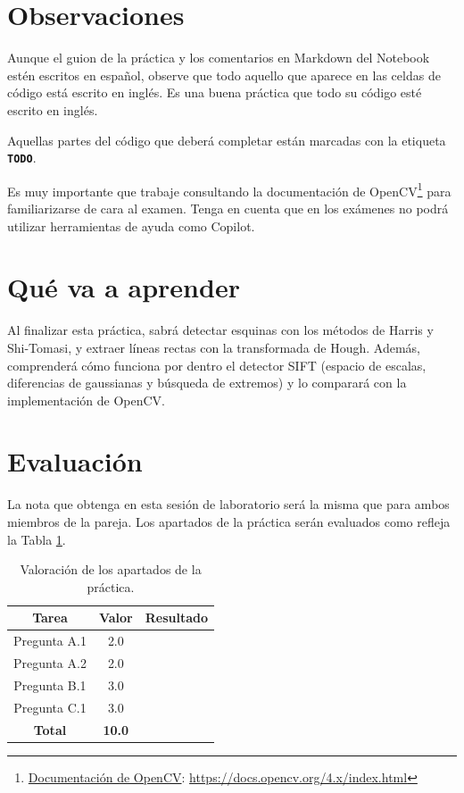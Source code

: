 \section{Observaciones}

Aunque el guion de la práctica y los comentarios en Markdown del Notebook estén escritos en español, observe que todo aquello que aparece en las celdas de código está escrito en inglés. Es una buena práctica que todo su código esté escrito en inglés.

Aquellas partes del código que deberá completar están marcadas con la etiqueta \textbf{\texttt{TODO}}.

Es muy importante que trabaje consultando la documentación de OpenCV\footnote{\href{https://docs.opencv.org/4.x/index.html}{Documentación de OpenCV}: \url{https://docs.opencv.org/4.x/index.html}} para familiarizarse de cara al examen. Tenga en cuenta que en los exámenes no podrá utilizar herramientas de ayuda como Copilot.

\section{Qué va a aprender}

Al finalizar esta práctica, sabrá detectar esquinas con los métodos de Harris y Shi-Tomasi, y extraer líneas rectas con la transformada de Hough. Además, comprenderá cómo funciona por dentro el detector SIFT (espacio de escalas, diferencias de gaussianas y búsqueda de extremos) y lo comparará con la implementación de OpenCV.

\section{Evaluación}

La nota que obtenga en esta sesión de laboratorio será la misma que para ambos miembros de la pareja. Los apartados de la práctica serán evaluados como refleja la Tabla \ref{table:evaluacion}.

\begin{table}[h!]
    \centering
    \begin{tabular}{|c|c|c|}
    \hline
    \textbf{Tarea} & \textbf{Valor} & \textbf{Resultado} \\
    \hline
    Pregunta A.1 & 2.0 & \\
    \hline
    Pregunta A.2 & 2.0 & \\
    \hline
    Pregunta B.1 & 3.0 & \\
    \hline
    Pregunta C.1 & 3.0 & \\
    \hline
    \textbf{Total} & \textbf{10.0} & \\
    \hline
    \end{tabular}
    \caption{Valoración de los apartados de la práctica.}
    \label{table:evaluacion}
\end{table}
